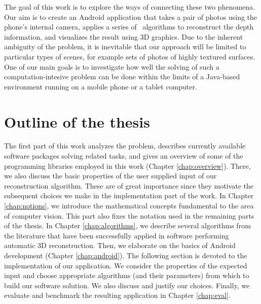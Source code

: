The goal of this work is to explore the ways of connecting these two phenomena. 
Our aim is to create an Android application that takes a pair of photos using the phone's internal camera, applies a series of \cv\ algorithms to reconstruct the depth information, and visualizes the result using 3D graphics. %
Due to the inherent ambiguity of the problem, it is inevitable that our approach will be limited to particular types of scenes, for example sets of photos of highly textured surfaces. 
One of our main goals is to investigate how well the solving of such a computation-intesive problem can be done within the limits of a Java-based environment running on a mobile phone or a tablet computer.

\section*{Outline of the thesis}

The first part of this work analyzes the problem, describes currently available software packages solving related tasks, and gives an overview of some of the programming libraries employed in this work (Chapter \ref{chap:overview}). 
There, we also discuss the basic properties of the user supplied input of our reconstruction algorithm. 
These are of great importance since they motivate the subsequent choices we make in the implementation part of the work.
In Chapter \ref{chap:notions}, we introduce the mathematical concepts fundamental to the area of computer vision. 
This part also fixes the notation used in the remaining parts of the thesis. 
In Chapter \ref{chap:algorithms}, we describe several algorithms from the literature that have been successfully applied in software performing automatic 3D reconstruction. 
Then, we elaborate on the basics of Android development (Chapter \ref{chap:android}).
The following section is devoted to the implementation of our application.
We consider the properties of the expected input and choose appropriate algorithms (and their parameters) from which to build our software solution. 
We also discuss and justify our choices. 
Finally, we evaluate and benchmark the resulting application in Chapter \ref{chap:eval}.

